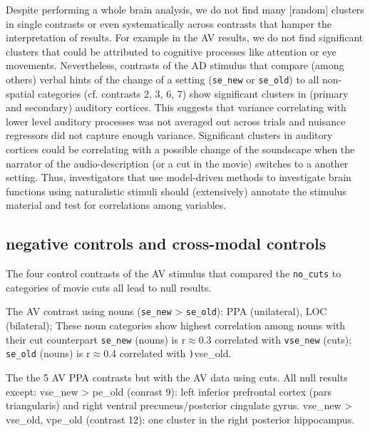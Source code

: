 \documentclass[english]{article}
\begin{document}
Despite performing a whole brain analysis, we do not find many [random] clusters
in single contrasts or even systematically across contrasts that hamper the
interpretation of results.
For example in the AV results, we do not find significant clusters that could be
attributed to cognitive processes like attention or eye movements.
Nevertheless, contrasts of the AD stimulus that compare (among others) verbal
hints of the change of a setting (\texttt{se\_new} or \texttt{se\_old}) to all
non-spatial categories (cf. contrasts 2, 3, 6, 7) show significant clusters in
(primary and secondary) auditory cortices.
This suggests that variance correlating with lower level auditory processes was
not averaged out across trials and nuisance regressors did not capture enough
variance.
Significant clusters in auditory cortices could be correlating with a possible
change of the soundscape when the narrator of the audio-description (or a cut in
the movie) switches to a another setting.
Thus, investigators that use model-driven methods to investigate brain functions
using naturalistic stimuli should (extensively) annotate the stimulus material
and test for correlations among variables.


\subsection{negative controls and cross-modal controls}



The four control contrasts of the AV stimulus that compared the
\texttt{no\_cuts} to categories of movie cuts all lead to null results.

The AV contrast using nouns (\texttt{se\_new} > \texttt{se\_old}): PPA
(unilateral), LOC (bilateral); These noun categories show highest correlation
among nouns with their cut counterpart \texttt{se\_new} (nouns) is r$\approx$0.3
correlated with \texttt{vse\_new} (cuts); \texttt{se\_old} (nouns) is
r$\approx$0.4 correlated with \texttt){vse\_old}.

The the 5 AV PPA contrasts but with the AV data using cuts. All null results
except:
vse\_new > pe\_old (conrast 9): left inferior prefrontal cortex (pars
triangularis) and right ventral precuneus/posterior cingulate gyrus.
vse\_new > vse\_old, vpe\_old (contrast 12): one cluster in the right posterior
hippocampus.
\end{document}

